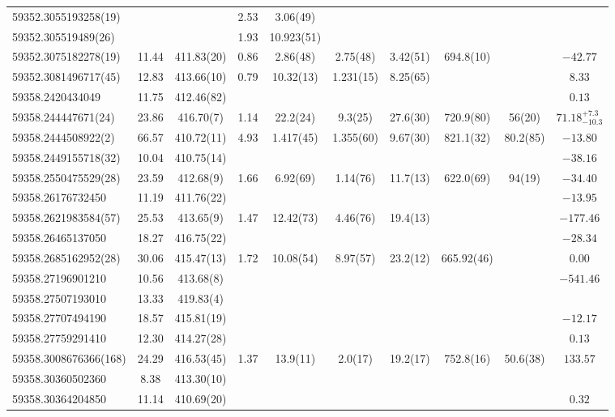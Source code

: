 {{\begin{longtable}{lccccccccc}
59352.3055193258(19)   &  & & 2.53 & 3.06(49) &  &   &  &  &  \\
59352.305519489(26)   &  & & 1.93 & 10.923(51) &  &    &  &  &  \\
\hline
59352.3075182278(19) & 11.44 & 411.83(20) & 0.86 & 2.86(48) & 2.75(48)  & 3.42(51) & 694.8(10) &  & $-42.77$ \\
\hline
59352.3081496717(45) & 12.83 & 413.66(10) & 0.79 & 10.32(13) & 1.231(15)  & 8.25(65) &  &  & $8.33$ \\
\hline
59358.2420434049 & 11.75 & 412.46(82) &  &  &  &   &  &  & $0.13$ \\
\hline
59358.244447671(24) & 23.86 & 416.70(7) & 1.14 & 22.2(24) & 9.3(25)  & 27.6(30) & 720.9(80) & 56(20) & $71.18^{+7.3}_{-10.3}$ \\
\hline
59358.2444508922(2) & 66.57 & 410.72(11) & 4.93 & 1.417(45) & 1.355(60)  & 9.67(30) & 821.1(32) & 80.2(85) & $-13.80$ \\
\hline
59358.2449155718(32) & 10.04 & 410.75(14) &  &  &   &  &  &  & $-38.16$ \\
\hline
59358.2550475529(28) & 23.59 & 412.68(9) & 1.66 & 6.92(69) & 1.14(76)  & 11.7(13) & 622.0(69) & 94(19) & $-34.40$ \\
\hline
59358.26176732450 & 11.19 & 411.76(22) &  &  &   &  &  &  & $-13.95$ \\
\hline
59358.2621983584(57) & 25.53 & 413.65(9) & 1.47 & 12.42(73) & 4.46(76)  & 19.4(13) &  &  & $-177.46$ \\
\hline
59358.26465137050 & 18.27 & 416.75(22) &  &  &   &  &  &  & $-28.34$ \\
\hline
59358.2685162952(28) & 30.06 & 415.47(13) & 1.72 & 10.08(54) & 8.97(57)  & 23.2(12) & 665.92(46) &  & $0.00$ \\
\hline
59358.27196901210 & 10.56 & 413.68(8) &  &  &   &  &  &  & $-541.46$ \\
\hline
59358.27507193010 & 13.33 & 419.83(4) &  &  &  &  &  &  &  \\
\hline
59358.27707494190 & 18.57 & 415.81(19) &  &  &   &  &  &  & $-12.17$ \\
\hline
59358.27759291410 & 12.30 & 414.27(28) &  &  &  &   &  &  & $0.13$ \\
\hline
59358.3008676366(168) & 24.29 & 416.53(45) & 1.37 & 13.9(11) & 2.0(17)  & 19.2(17) & 752.8(16) & 50.6(38) & $133.57$ \\
\hline
59358.30360502360 & 8.38 & 413.30(10) &  &  &  &   &  &  &  \\
\hline
59358.30364204850 & 11.14 & 410.69(20) &  &  &   &  &  &  & $0.32$ \\

\end{longtable}}}
